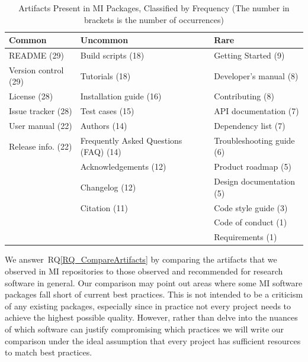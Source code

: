 \documentclass[final, 3p, times, authoryear]{elsarticle}
\newcommand{\rqref}[1]{RQ\ref{#1}}
\begin{document}
\begin{table}[ht!]
    \begin{center}
    \begin{tabular}{ p{4.6 cm} p{5.6 cm} p{5 cm}}
    \toprule
    \textbf{Common} & \textbf{Uncommon} & \textbf{Rare} \\
    \midrule
    README (29) & Build scripts (18) & Getting Started (9)\\
    Version control (29) & Tutorials (18) & Developer's manual (8)\\
    License (28) & Installation guide (16) & Contributing (8)\\
    Issue tracker (28) & Test cases (15) & API documentation (7)\\
    User manual (22) & Authors (14) & Dependency list (7)\\
    Release info. (22) & Frequently Asked Questions (FAQ) (14) & Troubleshooting guide (6)\\
     & Acknowledgements (12) & Product roadmap (5)\\
     & Changelog (12) & Design documentation (5)\\
     & Citation (11) & Code style guide (3)\\
     & & Code of conduct (1)\\
     & & Requirements (1)\\
    \bottomrule
    \end{tabular}
    \caption{Artifacts Present in MI Packages, Classified by Frequency (The number 
    in brackets is the number of occurrences)}
    \label{artifactspresent}
    \end{center}
\end{table}

We answer~\rqref{RQ_CompareArtifacts} by comparing the artifacts that we
observed in MI repositories to those observed and recommended for research
software in general. Our comparison may point out areas where some MI software
packages fall short of current best practices. This is not intended to be a
criticism of any existing packages, especially since in practice not every
project needs to achieve the highest possible quality. However, rather than
delve into the nuances of which software can justify compromising which
practices we will write our comparison under the ideal assumption that every
project has sufficient resources to match best practices.
    
\end{document}
